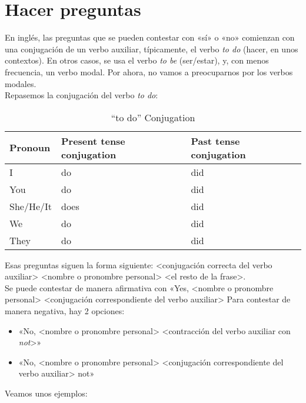 \section{Hacer preguntas}%
\label{sec:Hacer preguntas}

En ingl\'es, las preguntas que se pueden contestar con «s\'i» o «no» comienzan con una conjugaci\'on de un verbo auxiliar, t\'ipicamente, el verbo \emph{to do} (hacer, en unos contextos).
En otros casos, se usa el verbo \emph{to be} (ser/estar), y, con menos frecuencia, un verbo modal.
Por ahora, no vamos a preocuparnos por los verbos modales.\\

Repasemos la conjugaci\'on del verbo \emph{to do}:

\begin{table}[H]
	\centering
	\begin{tabular}{lll}
	\toprule
		\textbf{Pronoun} & \textbf{Present tense conjugation} & \textbf{Past tense conjugation}\\
	\midrule
		I & do & did\\
		You & do & did\\
		She/He/It & does & did \\
		We & do & did\\
		They & do & did\\
	\bottomrule
	\end{tabular}
	\caption{``to do'' Conjugation}
\end{table}

Esas preguntas siguen la forma siguiente:
<conjugaci\'on correcta del verbo auxiliar> <nombre o pronombre personal> <el resto de la frase>. \\

Se puede contestar de manera afirmativa con
«Yes, <nombre o pronombre personal> <conjugación correspondiente del verbo auxiliar>
Para contestar de manera negativa, hay 2 opciones:
\begin{itemize}
	\item «No, <nombre o pronombre personal> <contracción del verbo auxiliar con \emph{not}>»
	\item «No, <nombre o pronombre personal> <conjugación correspondiente del verbo auxiliar> not»
\end{itemize}

Veamos unos ejemplos:



